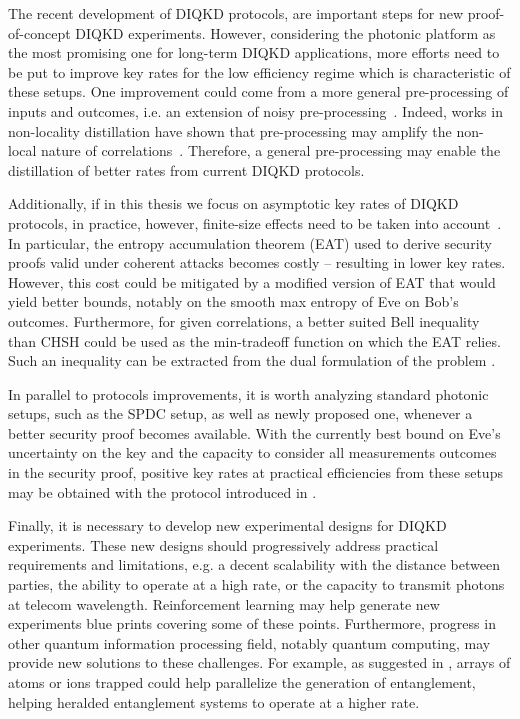 \medbreak

The recent development of DIQKD protocols, are important steps for new proof-of-concept DIQKD experiments.
However, considering the photonic platform as the most promising one for long-term DIQKD applications, more efforts need to be put to improve key rates for the low efficiency regime which is characteristic of these setups.
One improvement could come from a more general pre-processing of inputs and outcomes, i.e. an extension of noisy pre-processing~\cite{Ho2020}.
Indeed, works in non-locality distillation have shown that pre-processing may amplify the non-local nature of correlations~\cite{Forster2009}.
Therefore, a general pre-processing may enable the distillation of better rates from current DIQKD protocols.

Additionally, if in this thesis we focus on asymptotic key rates of DIQKD protocols, in practice, however, finite-size effects need to be taken into account~\cite{Tan2021}.
In particular, the entropy accumulation theorem (EAT) used to derive security proofs valid under coherent attacks becomes costly -- resulting in lower key rates.
However, this cost could be mitigated by a modified version of EAT that would yield better bounds, notably on the smooth max entropy of Eve on Bob's outcomes.
Furthermore, for given correlations, a better suited Bell inequality than CHSH could be used as the min-tradeoff function on which the EAT relies.
Such an inequality can be extracted from the dual formulation of the problem .

\medbreak

In parallel to protocols improvements, it is worth analyzing standard photonic setups, such as the SPDC setup, as well as newly proposed one, whenever a better security proof becomes available.
With the currently best bound on Eve's uncertainty on the key and the capacity to consider all measurements outcomes in the security proof, positive key rates at practical efficiencies from these setups may be obtained with the protocol introduced in \cite{Brown2021}.

\medbreak 

Finally, it is necessary to develop new experimental designs for DIQKD experiments.
These new designs should progressively address practical requirements and limitations, e.g. a decent scalability with the distance between parties, the ability to operate at a high rate, or the capacity to transmit photons at telecom wavelength.
Reinforcement learning may help generate new experiments blue prints covering some of these points.
Furthermore, progress in other quantum information processing field, notably quantum computing, may provide new solutions to these challenges.
For example, as suggested in \cite{Zapatero2023}, arrays of atoms or ions trapped could help parallelize the generation of entanglement, helping heralded entanglement systems to operate at a higher rate.

